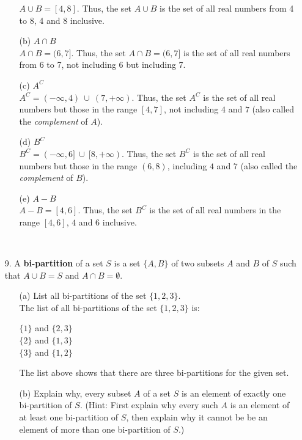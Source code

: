\documentclass[12pt, a4paper]{article}                  %
\begin{document}
\begin{enumerate}
\begin{enumerate}
$A \cup B = [4,8]$. Thus, the set $A \cup B$ is the set of all real numbers
from 4 to 8, 4 and 8 inclusive.
\\
\item[(b)]
$A \cap B$\\

$A \cap B = (6,7]$. Thus, the set $A \cap B = (6,7]$ is the set of all real numbers
from 6 to 7, not including 6 but including 7.
\\
\item[(c)]
$A^C$\\

$A^C = (-\infty, 4) \ \cup \ (7, +\infty)$. Thus, the set $A^C$ is the set of all real numbers
but those in the range $[4,7]$, not including $4$ and $7$ (also called the \textit{complement} of $A$).
\\
\item[(d)]
$B^C$\\

$B^C = (-\infty, 6] \ \cup \ [8, +\infty)$. Thus, the set $B^C$ is the set of all real numbers
but those in the range $(6,8)$, including $4$ and $7$ (also called the \textit{complement} of $B$).
\\

\item[(e)]
$A - B$\\

$A - B = [4,6]$. Thus, the set $B^C$ is the set of all real numbers
in the range $[4,6]$, $4$ and $6$ inclusive.
\end{enumerate}

\

\item[9.]
A \textbf{bi-partition} of a set $S$ is a set $\{A,B\}$ of two subsets
$A$ and $B$ of $S$ such that $A \cup B = S$ and $A \cap B = \emptyset$.
\begin{enumerate}
\item[(a)]
List all bi-partitions of the set $\{1,2,3\}$.
\\

The list of all bi-partitions of the set $\{1,2,3\}$ is:
\begin{center}
$\{1\}$ and $\{2,3\}$\\
$\{2\}$ and $\{1,3\}$\\
$\{3\}$ and $\{1,2\}$\\
\end{center}
The list above shows that there are three bi-partitions for the given set.
\\
\item[(b)]
Explain why, every subset $A$ of a set $S$ is an element of exactly one bi-partition of
$S$. (Hint: First explain why every such $A$ is an element of at least one bi-partition
of $S$, then explain why it cannot be be an element of more than one bi-partition
of $S$.)
\\


\end{enumerate}
\end{enumerate}
\end{document}
